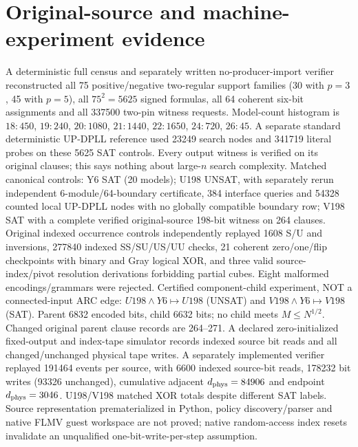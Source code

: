 \documentclass[11pt]{article}
\begin{document}
\section{Original-source and machine-experiment evidence}
A deterministic full census and separately written no-producer-import verifier reconstructed all 75 positive/negative two-regular support families (30 with $p=3$, 45 with $p=5$), all $75^2=5625$ signed formulas, all 64 coherent six-bit assignments and all 337500 two-pin witness requests. Model-count histogram is $18:450$, $19:240$, $20:1080$, $21:1440$, $22:1650$, $24:720$, $26:45$. A separate standard deterministic UP-DPLL reference used 23249 search nodes and 341719 literal probes on these 5625 SAT controls. Every output witness is verified on its original clauses; this says nothing about large-$n$ search complexity.
Matched canonical controls: Y6 SAT (20 models); U198 UNSAT, with separately rerun independent 6-module/64-boundary certificate, 384 interface queries and 54328 counted local UP-DPLL nodes with no globally compatible boundary row; V198 SAT with a complete verified original-source 198-bit witness on 264 clauses. Original indexed occurrence controls independently replayed 1608 S/U and inversions, 277840 indexed SS/SU/US/UU checks, 21 coherent zero/one/flip checkpoints with binary and Gray logical XOR, and three valid source-index/pivot resolution derivations forbidding partial cubes. Eight malformed encodings/grammars were rejected.
Certified component-child experiment, NOT a connected-input ARC edge: $U198\wedge Y6\mapsto U198$ (UNSAT) and $V198\wedge Y6\mapsto V198$ (SAT). Parent 6832 encoded bits, child 6632 bits; no child meets $M\le N^{1/2}$. Changed original parent clause records are 264--271. A declared zero-initialized fixed-output and index-tape simulator records indexed source bit reads and all changed/unchanged physical tape writes. A separately implemented verifier replayed 191464 events per source, with 6600 indexed source-bit reads, 178232 bit writes (93326 unchanged), cumulative adjacent $d_{\rm phys}=84906$ and endpoint $d_{\rm phys}=3046$. U198/V198 matched XOR totals despite different SAT labels. Source representation prematerialized in Python, policy discovery/parser and native FLMV guest workspace are not proved; native random-access index resets invalidate an unqualified one-bit-write-per-step assumption.
\end{document}
